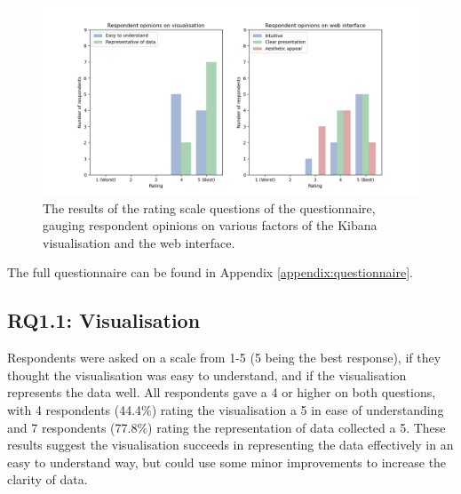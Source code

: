 \documentclass{l4proj}
\begin{document}
 \begin{figure}[h]
\centering
\includegraphics[width=\textwidth]{images/questionnaire_responses.png}
\caption{The results of the rating scale questions of the questionnaire, gauging respondent opinions on various factors of the Kibana visualisation and the web interface.}
\label{fig:questionnaire-ratings}
\end{figure}


The full questionnaire can be found in Appendix \ref{appendix:questionnaire}.

\subsection{RQ1.1: Visualisation}
Respondents were asked on a scale from 1-5 (5 being the best response), if they thought the visualisation was easy to understand, and if the visualisation represents the data well. All respondents gave a 4 or higher on both questions, with 4 respondents (44.4\%) rating the visualisation a 5 in ease of understanding and 7 respondents (77.8\%) rating the representation of data collected a 5. These results suggest the visualisation succeeds in representing the data effectively in an easy to understand way, but could use some minor improvements to increase the clarity of data.
\end{document}
